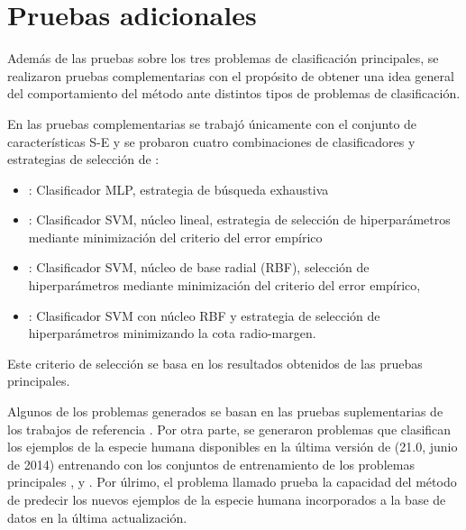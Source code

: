 %
%
%
\section{Pruebas adicionales}
%
Además de las pruebas sobre los tres problemas de clasificación
principales, se realizaron pruebas complementarias con el propósito de
obtener una idea general del comportamiento del método ante distintos
tipos de problemas de clasificación.

En las pruebas complementarias se trabajó únicamente con el conjunto
de características S-E y se probaron cuatro combinaciones de
clasificadores y estrategias de selección de :
%
\begin{itemize}
\item
  : Clasificador MLP, estrategia de búsqueda
  exhaustiva
\item
  : Clasificador SVM, núcleo lineal, estrategia de
  selección de hiperparámetros mediante minimización del criterio del error
  empírico
\item
  : Clasificador SVM, núcleo de base radial (RBF), selección de
  hiperparámetros mediante minimización del criterio del error empírico,
\item
  : Clasificador SVM con núcleo RBF y estrategia de
  selección de hiperparámetros minimizando la cota radio-margen.
\end{itemize}
%
Este criterio de selección se basa en los resultados obtenidos
de las pruebas principales.

Algunos de los problemas generados se basan en las pruebas
suplementarias de los trabajos de referencia \cite{xue,ng}.
Por otra parte, se generaron problemas que clasifican los ejemplos de
la especie humana disponibles en la última versión de \dset\mirbase
(21.0, {junio de 2014}) entrenando con los conjuntos de entrenamiento
de los problemas principales \prob\tripletsvm{}, \prob\mipred{} y
\prob\micropred{}.
Por úlrimo, el problema llamado \prob\deltamirbase{} prueba la
capacidad del método de predecir los nuevos ejemplos de la especie
humana incorporados a la base de datos \dset\mirbase en la última
actualización.
